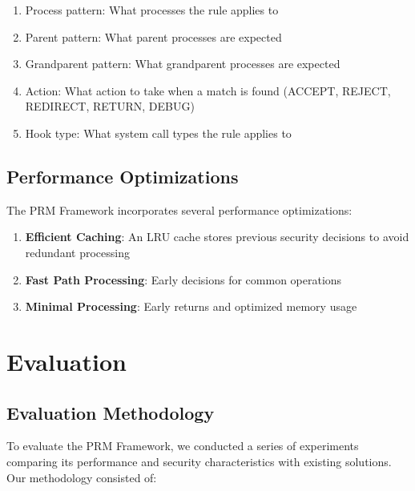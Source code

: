 \documentclass[conference]{IEEEtran}
\begin{document}
\begin{enumerate}
\item Process pattern: What processes the rule applies to
\item Parent pattern: What parent processes are expected
\item Grandparent pattern: What grandparent processes are expected
\item Action: What action to take when a match is found (ACCEPT, REJECT, REDIRECT, RETURN, DEBUG)
\item Hook type: What system call types the rule applies to
\end{enumerate}

\subsection{Performance Optimizations}
The PRM Framework incorporates several performance optimizations:

\begin{enumerate}
\item \textbf{Efficient Caching}: An LRU cache stores previous security decisions to avoid redundant processing
\item \textbf{Fast Path Processing}: Early decisions for common operations
\item \textbf{Minimal Processing}: Early returns and optimized memory usage
\end{enumerate}

\section{Evaluation}
\label{sec:evaluation}

\subsection{Evaluation Methodology}
To evaluate the PRM Framework, we conducted a series of experiments comparing its performance and security characteristics with existing solutions. Our methodology consisted of:
\end{document}
